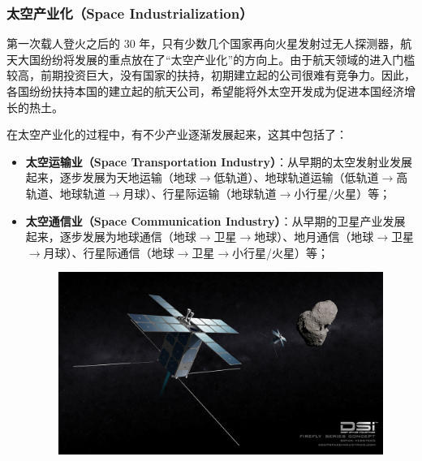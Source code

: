 \documentclass[letterpaper,10pt]{sphinxmanual}
\begin{document}

\subsubsection{太空产业化（Space Industrialization）}
\label{history:space-industrialization}\label{history:index-3}
第一次载人登火之后的 30 年，只有少数几个国家再向火星发射过无人探测器，航天大国纷纷将发展的重点放在了“太空产业化”的方向上。由于航天领域的进入门槛较高，前期投资巨大，没有国家的扶持，初期建立起的公司很难有竞争力。因此，各国纷纷扶持本国的建立起的航天公司，希望能将外太空开发成为促进本国经济增长的热土。

在太空产业化的过程中，有不少产业逐渐发展起来，这其中包括了：

\begin{itemize}
\item {} 
\textbf{太空运输业（Space Transportation Industry）}：从早期的太空发射业发展起来，逐步发展为天地运输（地球\(\rightarrow\)低轨道）、地球轨道运输（低轨道\(\rightarrow\)高轨道、地球轨道\(\rightarrow\)月球）、行星际运输（地球轨道\(\rightarrow\)小行星/火星）等；

\end{itemize}

\begin{itemize}
\item {} 
\textbf{太空通信业（Space Communication Industry）}：从早期的卫星产业发展起来，逐步发展为地球通信（地球\(\rightarrow\)卫星\(\rightarrow\)地球）、地月通信（地球\(\rightarrow\)卫星\(\rightarrow\)月球）、行星际通信（地球\(\rightarrow\)卫星\(\rightarrow\)小行星/火星）等；
\begin{figure}[htbp]
\centering

\includegraphics{DSI-Firefly-concept_BV-21-01-13.jpg}
\end{figure}

\end{itemize}
\end{document}

